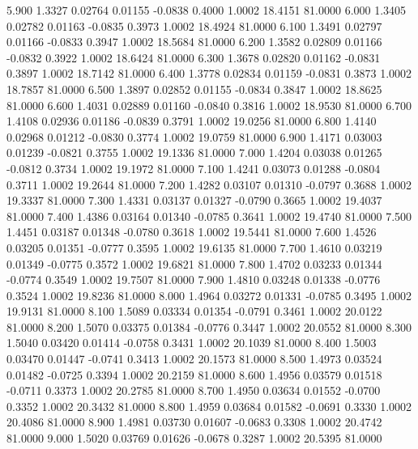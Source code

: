    5.900   1.3327   0.02764   0.01155  -0.0838   0.4000   1.0002  18.4151  81.0000
   6.000   1.3405   0.02782   0.01163  -0.0835   0.3973   1.0002  18.4924  81.0000
   6.100   1.3491   0.02797   0.01166  -0.0833   0.3947   1.0002  18.5684  81.0000
   6.200   1.3582   0.02809   0.01166  -0.0832   0.3922   1.0002  18.6424  81.0000
   6.300   1.3678   0.02820   0.01162  -0.0831   0.3897   1.0002  18.7142  81.0000
   6.400   1.3778   0.02834   0.01159  -0.0831   0.3873   1.0002  18.7857  81.0000
   6.500   1.3897   0.02852   0.01155  -0.0834   0.3847   1.0002  18.8625  81.0000
   6.600   1.4031   0.02889   0.01160  -0.0840   0.3816   1.0002  18.9530  81.0000
   6.700   1.4108   0.02936   0.01186  -0.0839   0.3791   1.0002  19.0256  81.0000
   6.800   1.4140   0.02968   0.01212  -0.0830   0.3774   1.0002  19.0759  81.0000
   6.900   1.4171   0.03003   0.01239  -0.0821   0.3755   1.0002  19.1336  81.0000
   7.000   1.4204   0.03038   0.01265  -0.0812   0.3734   1.0002  19.1972  81.0000
   7.100   1.4241   0.03073   0.01288  -0.0804   0.3711   1.0002  19.2644  81.0000
   7.200   1.4282   0.03107   0.01310  -0.0797   0.3688   1.0002  19.3337  81.0000
   7.300   1.4331   0.03137   0.01327  -0.0790   0.3665   1.0002  19.4037  81.0000
   7.400   1.4386   0.03164   0.01340  -0.0785   0.3641   1.0002  19.4740  81.0000
   7.500   1.4451   0.03187   0.01348  -0.0780   0.3618   1.0002  19.5441  81.0000
   7.600   1.4526   0.03205   0.01351  -0.0777   0.3595   1.0002  19.6135  81.0000
   7.700   1.4610   0.03219   0.01349  -0.0775   0.3572   1.0002  19.6821  81.0000
   7.800   1.4702   0.03233   0.01344  -0.0774   0.3549   1.0002  19.7507  81.0000
   7.900   1.4810   0.03248   0.01338  -0.0776   0.3524   1.0002  19.8236  81.0000
   8.000   1.4964   0.03272   0.01331  -0.0785   0.3495   1.0002  19.9131  81.0000
   8.100   1.5089   0.03334   0.01354  -0.0791   0.3461   1.0002  20.0122  81.0000
   8.200   1.5070   0.03375   0.01384  -0.0776   0.3447   1.0002  20.0552  81.0000
   8.300   1.5040   0.03420   0.01414  -0.0758   0.3431   1.0002  20.1039  81.0000
   8.400   1.5003   0.03470   0.01447  -0.0741   0.3413   1.0002  20.1573  81.0000
   8.500   1.4973   0.03524   0.01482  -0.0725   0.3394   1.0002  20.2159  81.0000
   8.600   1.4956   0.03579   0.01518  -0.0711   0.3373   1.0002  20.2785  81.0000
   8.700   1.4950   0.03634   0.01552  -0.0700   0.3352   1.0002  20.3432  81.0000
   8.800   1.4959   0.03684   0.01582  -0.0691   0.3330   1.0002  20.4086  81.0000
   8.900   1.4981   0.03730   0.01607  -0.0683   0.3308   1.0002  20.4742  81.0000
   9.000   1.5020   0.03769   0.01626  -0.0678   0.3287   1.0002  20.5395  81.0000
